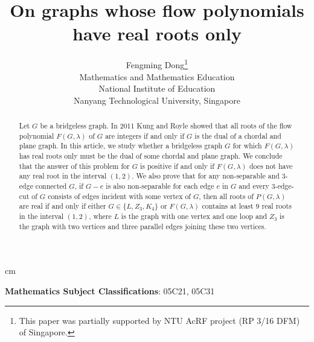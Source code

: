 \documentclass[11pt]{article}
\begin{document}
  
\newcommand{\resection}[1]
{\section{#1}\setcounter{equation}{0}}

\renewcommand{\theequation}{\thesection.\arabic{equation}}

\renewcommand{\labelenumi}{\rm(\roman{enumi})}

 cm

\title {On graphs whose flow polynomials have real roots only}

\author
{ 
Fengming Dong\thanks{This paper was partially supported 
by NTU AcRF project (RP 3/16 DFM) of Singapore.}\\
\small Mathematics and Mathematics Education\\
\small National Institute of Education\\
\small Nanyang Technological University, Singapore
}

\date{}

\maketitle

\begin{abstract}
Let $G$ be a bridgeless graph. 
In 2011 Kung and Royle showed that  
all roots of the flow polynomial $F(G,\lambda)$ of $G$
are integers 
if and only if $G$ is the dual of a chordal and plane graph. 
In this article, we study whether
a bridgeless graph $G$ for which 
$F(G,\lambda)$ has real roots only 
must be the  dual of some chordal and plane graph.
We conclude that the answer of this problem 
for $G$ is positive 
if and only if  $F(G,\lambda)$ does not have any real root in the interval $(1,2)$.
We also prove that 
for any non-separable and $3$-edge connected $G$, 
if $G-e$ is also non-separable for each edge $e$ in $G$
and every $3$-edge-cut of $G$ consists of edges incident with 
some vertex of $G$, 
then all roots of $P(G,\lambda)$ are real if and only if 
either $G\in \{L,Z_3,K_4\}$ 
or $F(G,\lambda)$ contains at least $9$ real roots 
in the interval $(1,2)$,
where $L$ is the graph with one vertex and one loop and 
$Z_3$ is the graph with two vertices and three parallel 
edges joining these two vertices. 
\end{abstract}

\def \MSC {Mathematics Subject Classifications}

{\bf \MSC}: {05C21, 05C31}
\end{document}
